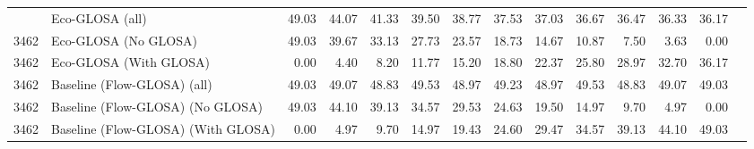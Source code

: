 \begin{table}[ht]
{\begin{tabular}{llrrrrrrrrrrrr}
        \addlinespace
        3462 & Eco-GLOSA (all)                    & 49.03 & 44.07 & 41.33 & 39.50 & 38.77 & 37.53 & 37.03 & 36.67 & 36.47 & 36.33 & 36.17 \\
        3462 & Eco-GLOSA (No GLOSA)               & 49.03 & 39.67 & 33.13 & 27.73 & 23.57 & 18.73 & 14.67 & 10.87 & 7.50 & 3.63 & 0.00 \\
        3462 & Eco-GLOSA (With GLOSA)             & 0.00 & 4.40 & 8.20 & 11.77 & 15.20 & 18.80 & 22.37 & 25.80 & 28.97 & 32.70 & 36.17 \\
        3462 & Baseline (Flow-GLOSA) (all)        & 49.03 & 49.07 & 48.83 & 49.53 & 48.97 & 49.23 & 48.97 & 49.53 & 48.83 & 49.07 & 49.03 \\
        3462 & Baseline (Flow-GLOSA) (No GLOSA)   & 49.03 & 44.10 & 39.13 & 34.57 & 29.53 & 24.63 & 19.50 & 14.97 & 9.70 & 4.97 & 0.00 \\
        3462 & Baseline (Flow-GLOSA) (With GLOSA) & 0.00 & 4.97 & 9.70 & 14.97 & 19.43 & 24.60 & 29.47 & 34.57 & 39.13 & 44.10 & 49.03 \\
        \bottomrule
      \end{tabular}
    }
\end{table}

